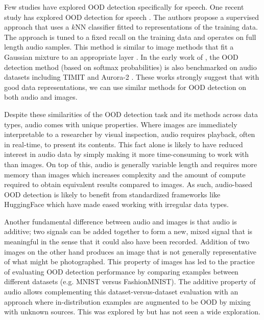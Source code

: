 Few studies have explored OOD detection specifically for speech. One recent study has explored OOD detection for speech \parencite{bukhsh_outofdistribution_2023}. The authors propose a supervised approach that uses a $k$NN classifier fitted to representations of the training data. The approach is tuned to a fixed recall on the training data and operates on full length audio samples. This method is similar to image methods that fit a Gaussian mixture to an appropriate layer \parencite{lee_simple_2018, xiao_we_2021}. In the early work of \textcite{hendrycks_baseline_2017}, the OOD detection method (based on softmax probabilities) is also benchmarked on audio datasets including TIMIT and Aurora-2 \parencite{garofolo_timit_1993,pearce_aurora_2000}. These works strongly suggest that with good data representations, we can use similar methods for OOD detection on both audio and images.

Despite these similarities of the OOD detection task and its methods across data types, audio comes with unique properties. 
Where images are immediately interpretable to a researcher by visual inspection, audio requires playback, often in real-time, to present its contents. This fact alone is likely to have reduced interest in audio data by simply making it more time-consuming to work with than images. On top of this, audio is generally variable length and requires more memory than images which increases complexity and the amount of compute required to obtain equivalent results compared to images. 
As such, audio-based OOD detection is likely to benefit from standardized frameworks like HuggingFace \parencite{wolf_huggingface_2020,lhoest_datasets_2021} which have made eased working with irregular data types. 

Another fundamental difference between audio and images is that audio is additive; two signals can be added together to form a new, mixed signal that is meaningful in the sense that it could also have been recorded. 
Addition of two images on the other hand produces an image that is not generally representative of what might be photographed. 
This property of images has led to the practice of evaluating OOD detection performance by comparing examples between different datasets (e.g. MNIST versus FashionMNIST). 
The additive property of audio allows complementing this dataset-versus-dataset evaluation with an approach where in-distribution examples are augmented to be OOD by mixing with unknown sources. This was explored by \textcite{hendrycks_baseline_2017} but has not seen a wide exploration. 

